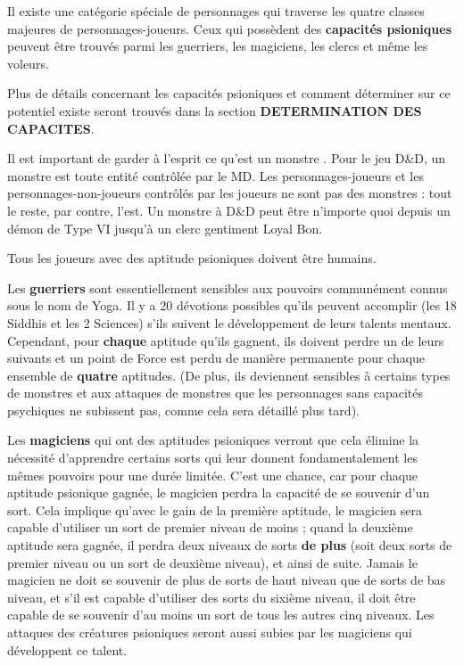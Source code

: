 \documentclass[11pt]{article}
\begin{document}
{\parindent0pt

Il existe une catégorie spéciale de personnages qui traverse les quatre classes majeures de personnages-joueurs. Ceux qui possèdent des \textbf{capacités psioniques} peuvent être trouvés parmi les guerriers, les magiciens, les clercs et même les voleurs.

\bigskip

Plus de détails concernant les capacités psioniques et comment déterminer sur ce potentiel existe seront trouvés dans la section \textbf{DETERMINATION DES CAPACITES}.

\bigskip

Il est important de garder à l'esprit ce qu'est un \og monstre \fg{}. Pour le jeu D\&D, un monstre est toute entité contrôlée par le MD. Les personnages-joueurs et les personnages-non-joueurs contrôlés par les joueurs ne sont pas des monstres : tout le reste, par contre, l'est. Un monstre à D\&D peut être n'importe quoi depuis un démon de Type VI jusqu'à un clerc gentiment Loyal Bon.

\bigskip

Tous les joueurs avec des aptitude psioniques doivent être humains.

\bigskip

Les \textbf{guerriers} sont essentiellement sensibles aux pouvoirs communément connus sous le nom de Yoga. Il y a 20 \og dévotions \fg{} possibles qu'ils peuvent accomplir (les 18 Siddhis et les 2 Sciences) s'ils suivent le développement de leurs talents mentaux. Cependant, pour \textbf{chaque} aptitude qu'ils gagnent, ils doivent perdre un de leurs suivants et un point de Force est perdu de manière permanente pour chaque ensemble de \textbf{quatre} aptitudes. (De plus, ils deviennent sensibles à certains types de monstres et aux attaques de monstres que les personnages sans capacités psychiques ne subissent pas, comme cela sera détaillé plus tard).

\bigskip

Les \textbf{magiciens} qui ont des aptitudes psioniques verront que cela élimine la nécessité d'apprendre certains sorts qui leur donnent fondamentalement les mêmes pouvoirs pour une durée limitée. C'est une chance, car pour chaque aptitude psionique gagnée, le magicien perdra la capacité de se souvenir d'un sort. Cela implique qu'avec le gain de la première aptitude, le magicien sera capable d'utiliser un sort de premier niveau de moins ; quand la deuxième aptitude sera gagnée, il perdra deux niveaux de sorts \textbf{de plus} (soit deux sorts de premier niveau ou un sort de deuxième niveau), et ainsi de suite. Jamais le magicien ne doit se souvenir de plus de sorts de haut niveau que de sorts de bas niveau, et s'il est capable d'utiliser des sorts du sixième niveau, il doit être capable de se souvenir d'au moins un sort de tous les autres cinq niveaux. Les attaques des créatures psioniques seront aussi subies par les magiciens qui développent ce talent.

}
\end{document}
